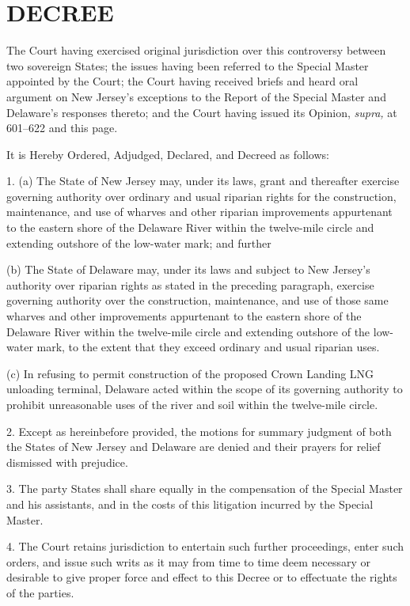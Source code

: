 
\setcounter{page}{623}

\section{DECREE}

  The Court having exercised original jurisdiction over this controversy
between two sovereign States; the issues having been referred to the
Special Master appointed by the Court; the Court having received briefs
and heard oral argument on New Jersey's exceptions to the Report of
the Special Master and Delaware's responses thereto; and the Court
having issued its Opinion, \emph{supra,} at 601--622 and this page.

  It is Hereby Ordered, Adjudged, Declared, and Decreed as follows:

  1. (a) The State of New Jersey may, under its laws, grant and
thereafter exercise governing authority over ordinary \newpage  and usual
riparian rights for the construction, maintenance, and use of wharves
and other riparian improvements appurtenant to the eastern shore of the
Delaware River within the twelve-mile circle and extending outshore of
the low-water mark; and further

  (b) The State of Delaware may, under its laws and subject to New
Jersey's authority over riparian rights as stated in the preceding
paragraph, exercise governing authority over the construction,
maintenance, and use of those same wharves and other improvements
appurtenant to the eastern shore of the Delaware River within the
twelve-mile circle and extending outshore of the low-water mark, to the
extent that they exceed ordinary and usual riparian uses.

  (c) In refusing to permit construction of the proposed Crown Landing
LNG unloading terminal, Delaware acted within the scope of its governing
authority to prohibit unreasonable uses of the river and soil within the
twelve-mile circle.

  2. Except as hereinbefore provided, the motions for summary judgment
of both the States of New Jersey and Delaware are denied and their
prayers for relief dismissed with prejudice.

  3. The party States shall share equally in the compensation of the
Special Master and his assistants, and in the costs of this litigation
incurred by the Special Master.

  4. The Court retains jurisdiction to entertain such further
proceedings, enter such orders, and issue such writs as it may from time
to time deem necessary or desirable to give proper force and effect to
this Decree or to effectuate the rights of the parties.
